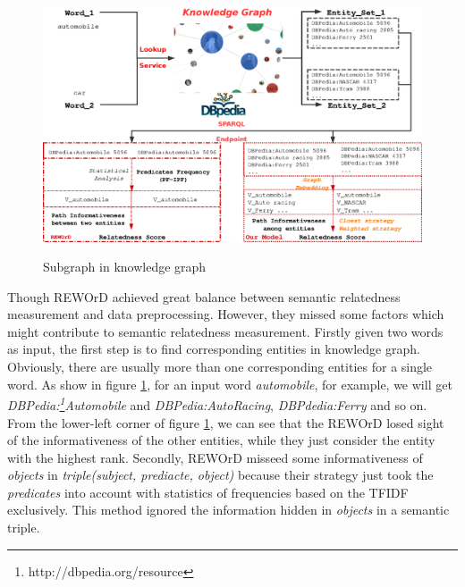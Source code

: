 \begin{figure}
    \flushleft
    \includegraphics[width=1.0\textwidth]{pic/overview.eps}\\
    \caption{Subgraph in knowledge graph}
    \label{overview}
\end{figure}

Though REWOrD\cite{aaai/Pirro12} achieved great balance between
semantic relatedness measurement and data preprocessing.
However, they missed some factors which might contribute to semantic relatedness measurement. 
Firstly given two words as input, the first step is to find corresponding entities in knowledge graph.
Obviously, there are usually more than one corresponding entities for a single word.
As show in figure \ref{overview}, for an input word \emph{automobile}, for example, 
we will get \emph{DBPedia:\footnote{http://dbpedia.org/resource}Automobile} and
\emph{DBPedia:Auto\underline{\hspace{0.5em}}Racing}, \emph{DBPdedia:Ferry} and so on.
From the lower-left corner of figure \ref{overview}, we can see that the REWOrD losed sight of
the informativeness of the other entities, while they just consider the entity with the highest rank.
Secondly, REWOrD misseed some informativeness of \emph{objects} in \emph{triple(subject, prediacte, object)}
because their strategy just took the \emph{predicates} into account with statistics of frequencies based on the TFIDF exclusively.
This method ignored the information hidden in \emph{objects} in a semantic triple.

